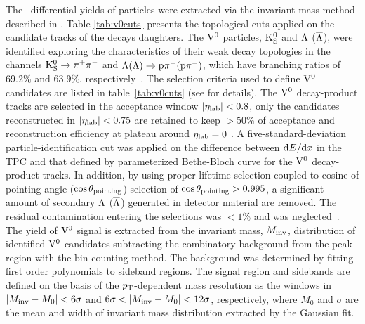 The \pt\ differential yields of \Vzero particles were extracted via the invariant mass method described in \cite{Abelev:2013haa}. Table \ref{tab:v0cuts} presents the topological cuts applied on the candidate tracks of the decays daughters. The ${\rm V}^{0}$ particles, $\rm{K}^{0}_{\rm S}$ and $\Lambda$ ($\overline{\Lambda}$), were identified exploring the characteristics of their weak decay topologies in the channels $\rm{K}^{0}_{\rm S}\to\pi^{+}\pi^{-}$ and $\Lambda(\overline{\Lambda})\to{\rm p}\pi^{-}(\overline{\rm p}\pi^{-})$, which have branching ratios of $69.2\%$ and $63.9\%$, respectively~\cite{Agashe:2014kda}.
The selection criteria used to define ${\rm V}^{0}$ candidates are listed in table~\ref{tab:v0cuts} (see \cite{Aamodt:2011zza} for details).
The ${\rm V}^{0}$ decay-product tracks are selected in the acceptance window $\left|\eta_{\rm lab}\right|<0.8$, only the candidates reconstructed in $\left|\eta_{\rm lab}\right|<0.75$ are retained to keep $>50\%$ of acceptance and reconstruction efficiency at plateau around $\eta_{\rm lab}=0$ .
A five-standard-deviation particle-identification cut was applied on the difference between ${\rm d}E/{\rm d}x$ in the TPC and that defined by parameterized Bethe-Bloch curve for the ${\rm V}^{0}$ decay-product tracks.
In addition, by using proper lifetime selection coupled to cosine of pointing angle ($\cos\theta_{\rm pointing}$) selection of $\cos\theta_{\rm pointing}>0.995$, a significant amount of secondary $\Lambda$ ($\overline{\Lambda}$) generated in detector material are removed.
The residual contamination entering the selections was $<1\%$ and was neglected~\cite{Abelev:2013xaa}.
The yield of ${\rm V}^{0}$ signal is extracted from the invariant mass, $M_{\rm inv}$, distribution of identified ${\rm V}^{0}$ candidates subtracting the combinatory background from the peak region with the bin counting method.
The background was determined by fitting first order polynomials to sideband regions.
The signal region and sidebands are defined on the basis of the $p_{\mathrm{T}}$-dependent mass resolution as the windows in $\left|M_{\rm inv}-M_{0}\right|<6\sigma$ and $6\sigma<\left|M_{\rm inv}-M_{0}\right|<12\sigma$, respectively, where $M_{0}$ and $\sigma$ are the mean and width of invariant mass distribution extracted by the Gaussian fit.

